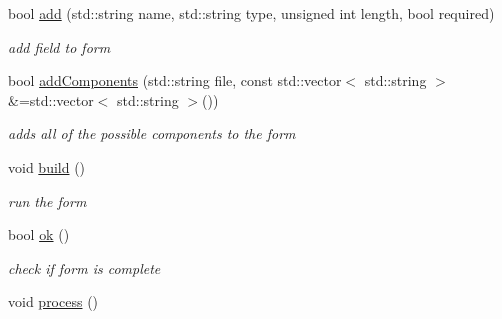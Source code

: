 \begin{DoxyCompactItemize}
bool \hyperlink{classFA_1_1Form_a792d137754257e45960910747f80e9e6}{add} (std\-::string name, std\-::string type, unsigned int length, bool required)
\begin{DoxyCompactList}\small\item\em add field to form \end{DoxyCompactList}\item 
bool \hyperlink{classFA_1_1Form_a05beb2b9ca100cd046d02aa9b41618e7}{add\-Components} (std\-::string file, const std\-::vector$<$ std\-::string $>$ \&=std\-::vector$<$ std\-::string $>$())
\begin{DoxyCompactList}\small\item\em adds all of the possible components to the form \end{DoxyCompactList}\item 
\hypertarget{classFA_1_1Form_aff3263e5b4f3a8e0fe24081e20959419}{void \hyperlink{classFA_1_1Form_aff3263e5b4f3a8e0fe24081e20959419}{build} ()}\label{classFA_1_1Form_aff3263e5b4f3a8e0fe24081e20959419}

\begin{DoxyCompactList}\small\item\em run the form \end{DoxyCompactList}\item 
bool \hyperlink{classFA_1_1Form_ae100d99ac80468b6fd4bbf4fe9bb7060}{ok} ()
\begin{DoxyCompactList}\small\item\em check if form is complete \end{DoxyCompactList}\item 
\hypertarget{classFA_1_1Form_a2e9badd806d51ecbffa08dd006dc2394}{void \hyperlink{classFA_1_1Form_a2e9badd806d51ecbffa08dd006dc2394}{process} ()}\label{classFA_1_1Form_a2e9badd806d51ecbffa08dd006dc2394}


\end{DoxyCompactItemize}

